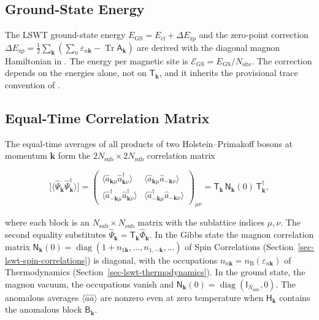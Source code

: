 \subsection{Ground-State Energy}

The LSWT ground-state energy \(E_{\mathrm{GS}}=E_{\mathrm{cl}}+\Delta E_{\mathrm{zp}}\) and the zero-point correction \(\Delta E_{\mathrm{zp}}=\frac12\sum_{\mathbf k}(\sum_n\varepsilon_{n\mathbf k}-\operatorname{Tr}\mathsf A_{\mathbf k})\) are derived with the diagonal magnon Hamiltonian in . The energy per magnetic site is \(\mathcal E_{\mathrm{GS}}=E_{\mathrm{GS}}/N_{\mathrm{site}}\). The correction depends on the energies alone, not on \(\mathsf T_{\mathbf k}\), and it inherits the provisional trace convention of .

\subsection{Equal-Time Correlation Matrix}

The equal-time averages of all products of two Holstein--Primakoff bosons at momentum \(\mathbf k\) form the \(2N_{\mathrm{sub}}\times2N_{\mathrm{sub}}\) correlation matrix

\begin{equation}\label{eq-lswt-boson-correlation-matrix}
\Big[\big\langle\hat\Psi_{\mathbf k}\hat\Psi_{\mathbf k}^\dagger\big\rangle\Big]
=\begin{pmatrix}
\langle\hat a_{\mathbf k\mu}\hat a_{\mathbf k\nu}^\dagger\rangle & \langle\hat a_{\mathbf k\mu}\hat a_{-\mathbf k\nu}\rangle\\
\langle\hat a_{-\mathbf k\mu}^\dagger\hat a_{\mathbf k\nu}^\dagger\rangle & \langle\hat a_{-\mathbf k\mu}^\dagger\hat a_{-\mathbf k\nu}\rangle
\end{pmatrix}_{\mu\nu}
=\mathsf T_{\mathbf k}\,\mathsf N_{\mathbf k}(0)\,\mathsf T_{\mathbf k}^\dagger,
\end{equation}

where each block is an \(N_{\mathrm{sub}}\times N_{\mathrm{sub}}\) matrix with the sublattice indices \(\mu,\nu\). The second equality substitutes \(\hat\Psi_{\mathbf k}=\mathsf T_{\mathbf k}\hat\Phi_{\mathbf k}\). In the Gibbs state the magnon correlation matrix \(\mathsf N_{\mathbf k}(0)=\operatorname{diag}(1+n_{1\mathbf k},\ldots,n_{1,-\mathbf k},\ldots)\) of Spin Correlations (Section~\ref{sec-lswt-spin-correlations}) is diagonal, with the occupations \(n_{n\mathbf k}=n_{\mathrm B}(\varepsilon_{n\mathbf k})\) of Thermodynamics (Section~\ref{sec-lswt-thermodynamics}). In the ground state, the magnon vacuum, the occupations vanish and \(\mathsf N_{\mathbf k}(0)=\operatorname{diag}(\mathsf I_{N_{\mathrm{sub}}},0)\). The anomalous averages \(\langle\hat a\hat a\rangle\) are nonzero even at zero temperature when \(\mathsf H_{\mathbf k}\) contains the anomalous block \(\mathsf B_{\mathbf k}\).

